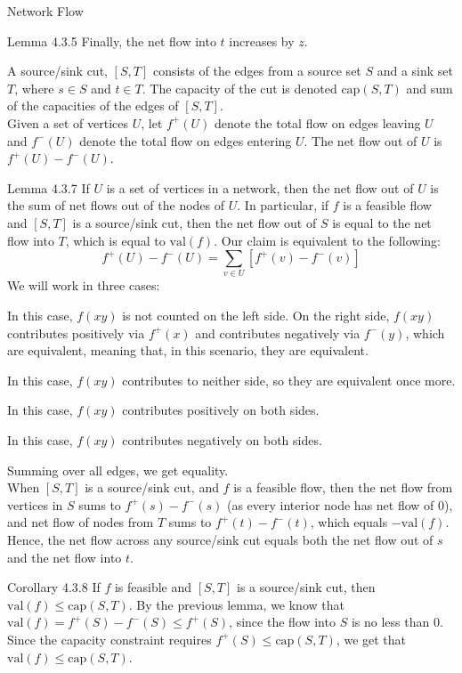 \documentclass[10pt]{extarticle}
\begin{document}
\begin{problem}{Network Flow}
\begin{problem}{Lemma 4.3.5}
      Finally, the net flow into $t$ increases by $z$.
    \end{problem}
    A source/sink cut, $[S,T]$ consists of the edges from a source set $S$ and a sink set $T$, where $s\in S$ and $t\in T$. The capacity of the cut is denoted $\textrm{cap}(S,T)$ and sum of the capacities of the edges of $[S,T]$.\\

    Given a set of vertices $U$, let $f^+(U)$ denote the total flow on edges leaving $U$ and $f^-(U)$ denote the total flow on edges entering $U$. The net flow out of $U$ is $f^+(U) - f^-(U)$.
    \begin{problem}{Lemma 4.3.7}
      If $U$ is a set of vertices in a network, then the net flow out of $U$ is the sum of net flows out of the nodes of $U$. In particular, if $f$ is a feasible flow and $[S,T]$ is a source/sink cut, then the net flow out of $S$ is equal to the net flow into $T$, which is equal to $\textrm{val}(f)$.
      \tcblower
      Our claim is equivalent to the following:
      \[
        f^+(U) - f^-(U) = \sum_{v\in U} [f^+(v) - f^-(v)]
      \]
      We will work in three cases:
      \begin{description}[font=\normalfont\scshape]
        \item[$x,y\in U$:] In this case, $f(xy)$ is not counted on the left side. On the right side, $f(xy)$ contributes positively via $f^+(x)$ and contributes negatively via $f^-(y)$, which are equivalent, meaning that, in this scenario, they are equivalent.
        \item[$x,y\notin U$:] In this case, $f(xy)$ contributes to neither side, so they are equivalent once more.
        \item[$xy\in U,\overline{U}$:] In this case, $f(xy)$ contributes positively on both sides.
        \item[$xy\in \overline{U},U$:] In this case, $f(xy)$ contributes negatively on both sides.
      \end{description}
      Summing over all edges, we get equality.\\

      When $[S,T]$ is a source/sink cut, and $f$ is a feasible flow, then the net flow from vertices in $S$ sums to $f^+(s) - f^-(s)$ (as every interior node has net flow of $0$), and net flow of nodes from $T$ sums to $f^+(t) - f^-(t)$, which equals $-\textrm{val}(f)$. Hence, the net flow across any source/sink cut equals both the net flow out of $s$ and the net flow into $t$.
    \end{problem}
    \begin{problem}{Corollary 4.3.8}
      If $f$ is feasible and $[S,T]$ is a source/sink cut, then $\textrm{val}(f) \leq \textrm{cap}(S,T)$.
      \tcblower
      By the previous lemma, we know that $\textrm{val}(f) = f^+(S) - f^-(S) \leq f^+(S)$, since the flow into $S$ is no less than $0$. Since the capacity constraint requires $f^+(S) \leq \textrm{cap}(S,T)$, we get that $\textrm{val}(f) \leq \textrm{cap}(S,T)$.
    \end{problem}
  \end{problem}
\end{document}
